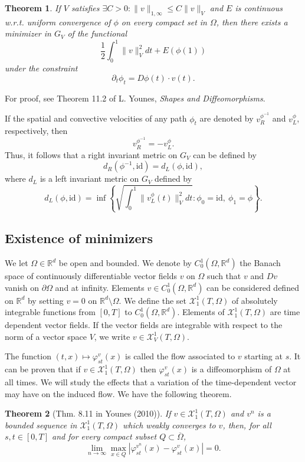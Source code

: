 \documentclass{article}
\theoremstyle{plain}
\newtheorem{teo}{Theorem}[section]
\theoremstyle{definition}
\numberwithin{equation}{section}
\newcommand{\R}{\ensuremath{\mathbb{R}}}
\newcommand{\id}{\ensuremath{\mathrm{id}}}
\begin{document}
\begin{teo}
If $V$ satisfies $\exists C>0: \|v\|_{1,\infty}\leq C\|v\|_V$ and $E$ is continuous w.r.t. uniform convergence of $\phi$ on every compact set in $\Omega$, then there exists a minimizer in $G_V$ of the functional 
\[
  \frac{1}{2}\int_0^1\|v\|^2_Vdt + E(\phi(1))
\]
under the constraint
\[
\partial_t\phi_t=D\phi(t)\cdot v(t).
\]
\end{teo}

For proof, see Theorem 11.2 of L. Younes, \textit{Shapes and Diffeomorphisms}.

If the spatial and convective velocities of any path $\phi_t$ are denoted by $v_R^{\phi^{-1}}$ and $v_L^\phi$, respectively, then 
\[
v_R^{\phi^{-1}}=-v_L^\phi.
\]
Thus, it follows that a right invariant metric on $G_V$ can be defined by
\[
d_R(\phi^{-1},\id)=d_L(\phi,\id),
\]
where $d_L$ is a left invariant metric on $G_V$ defined by
\[
 d_L(\phi,\id)=\inf\left\{\sqrt{\int_0^1\|v_L^\phi(t)\|_V^2 dt}: \phi_0=\id,\ \phi_1=\phi \right\}.
\]

\subsection{Existence of minimizers}
We let $\Omega\in\R^d$ be open and bounded. We denote by $C^1_0(\Omega,\R^d)$ the Banach space of continuously differentiable vector fields $v$  on $\Omega$ such that $v$ and $Dv$ vanish on $\partial\Omega$ and at infinity. Elements $v\in C^1_0(\Omega,\R^d)$ can be considered defined on $\R^d$ by setting $v=0$ on $\R^d\setminus\Omega$. We define the set $\mathcal{X}_1^1(T,\Omega)$ of absolutely integrable functions from $[0,T]$ to $C^1_0(\Omega,\R^d)$. Elements of $\mathcal{X}_1^1(T,\Omega)$ are time dependent vector fields. If the vector fields are integrable with respect to the norm of a vector space $V$, we write $v\in \mathcal{X}_V^1(T,\Omega)$.

The function $(t,x)\mapsto \varphi^v_{st}(x)$ is called the flow associated to $v$ starting at $s$. It can be proven that if $v\in\mathcal{X}_1^1(T,\Omega)$ then $\varphi^v_{st}(x)$ is a diffeomorphism of $\Omega$ at all times. We will study the effects that a variation of the time-dependent vector may have on the induced flow. We have the following theorem.

\begin{teo}[Thm. 8.11 in Younes (2010)]
\label{teo:811}
If $v\in\mathcal{X}_1^1(T,\Omega)$ and $v^n$ is a bounded sequence in $\mathcal{X}_1^1(T,\Omega)$ which weakly converges to $v$, then, for all $s,t\in[0,T]$ and for every compact subset $Q\subset \overline{\Omega}$,
\[
\lim_{n\to\infty} \max_{x\in Q} |\varphi_{st}^{v^n}(x)-\varphi_{st}^{v}(x)|=0.
\]
\end{teo}
\end{document}
